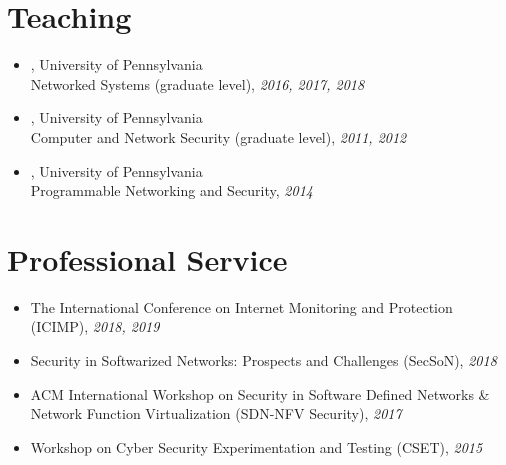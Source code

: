 \documentclass[a4paper,11pt]{article}
\begin{document}
\section{\LARGE Teaching}
\begin{itemize}
	\item{
, University of Pennsylvania \\
Networked Systems (graduate level), \emph{2016, 2017, 2018} \\
}

\item{
, University of Pennsylvania \\
Computer and Network Security (graduate level), \emph{2011, 2012} \\
}

\item{
, University of Pennsylvania \\
Programmable Networking and Security, \emph{2014} \\
}

\end{itemize}

\section{\LARGE Professional Service}


\begin{itemize}[topsep=2pt]
\item{
The International Conference on Internet Monitoring and Protection (ICIMP), \textit{2018, 2019}
}
\item{
Security in Softwarized Networks: Prospects and Challenges (SecSoN), \textit{2018}
}
\item{
ACM International Workshop on
Security in Software Defined Networks \& Network Function Virtualization (SDN-NFV Security), \textit{2017}
}
\item{
Workshop on Cyber Security Experimentation and Testing (CSET), \textit{2015} 
}
\end{itemize}

\end{document}
